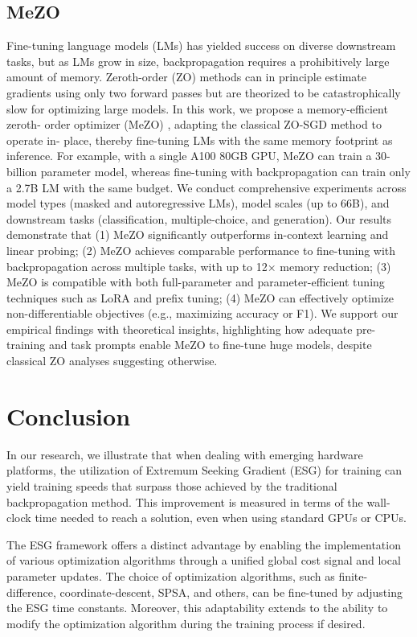 \documentclass[nohyperref]{article}
\theoremstyle{plain}
\theoremstyle{definition}
\theoremstyle{remark}
\begin{document}
\subsection{MeZO}
Fine-tuning language models (LMs) has yielded success on diverse downstream
tasks, but as LMs grow in size, backpropagation requires a prohibitively large
amount of memory. Zeroth-order (ZO) methods can in principle estimate gradients
using only two forward passes but are theorized to be catastrophically slow for
optimizing large models. In this work, we propose a memory-efficient zeroth-
order optimizer (MeZO) \cite{malladi2023finetuning}, adapting the classical ZO-SGD method to operate in-
place, thereby fine-tuning LMs with the same memory footprint as inference. For
example, with a single A100 80GB GPU, MeZO can train a 30-billion parameter
model, whereas fine-tuning with backpropagation can train only a 2.7B LM with
the same budget. We conduct comprehensive experiments across model types
(masked and autoregressive LMs), model scales (up to 66B), and downstream tasks
(classification, multiple-choice, and generation). Our results demonstrate that (1)
MeZO significantly outperforms in-context learning and linear probing; (2) MeZO
achieves comparable performance to fine-tuning with backpropagation across
multiple tasks, with up to 12× memory reduction; (3) MeZO is compatible with
both full-parameter and parameter-efficient tuning techniques such as LoRA and
prefix tuning; (4) MeZO can effectively optimize non-differentiable objectives (e.g.,
maximizing accuracy or F1). We support our empirical findings with theoretical
insights, highlighting how adequate pre-training and task prompts enable MeZO to
fine-tune huge models, despite classical ZO analyses suggesting otherwise.
\section{Conclusion}
In our research, we illustrate that when dealing with emerging hardware platforms, the utilization of Extremum Seeking Gradient (ESG) for training can yield training speeds that surpass those achieved by the traditional backpropagation method. This improvement is measured in terms of the wall-clock time needed to reach a solution, even when using standard GPUs or CPUs.

The ESG framework offers a distinct advantage by enabling the implementation of various optimization algorithms through a unified global cost signal and local parameter updates. The choice of optimization algorithms, such as finite-difference, coordinate-descent, SPSA, and others, can be fine-tuned by adjusting the ESG time constants. Moreover, this adaptability extends to the ability to modify the optimization algorithm during the training process if desired.
\end{document}
